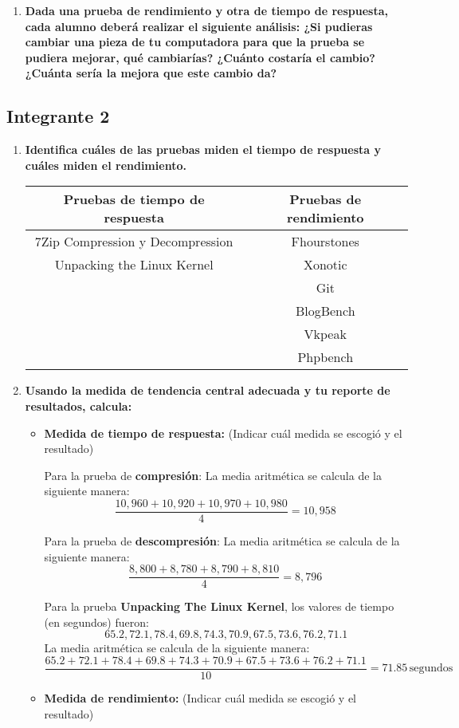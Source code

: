 \documentclass[12pt]{article}
\newcommand{\pl}[1]{\item \textbf{ #1 }}
\begin{document}
\begin{enumerate}[label=(\arabic{section}.\arabic{subsection}.\arabic{enumi})]
    \pl{Dada una prueba de rendimiento y otra de tiempo de respuesta, cada alumno deberá realizar el siguiente análisis: ¿Si pudieras cambiar una pieza de tu computadora para que la prueba se pudiera mejorar, qué cambiarías? ¿Cuánto costaría el cambio? ¿Cuánta sería la mejora que este cambio da?}

\end{enumerate}

\subsection{Integrante 2}

\begin{enumerate}[label=(\arabic{section}.\arabic{subsection}.\arabic{enumi})]
    \pl{Identifica cuáles de las pruebas miden el tiempo de respuesta y cuáles miden el rendimiento.}
    \begin{table}[htb]
        \centering
        \begin{tabular}{|c|c|}
        \hline
        Pruebas de tiempo de respuesta & Pruebas de rendimiento \\
        \hline
        7Zip Compression y Decompression & Fhourstones \\
        \hline
        Unpacking the Linux Kernel & Xonotic \\
        \hline
         & Git \\
        \hline
        & BlogBench \\
        \hline
        & Vkpeak \\
        \hline
        & Phpbench \\
        \hline
        \end{tabular}
    \end{table}\par

    \pl{Usando la medida de tendencia central adecuada y tu reporte de resultados, calcula:}
    \begin{itemize}
        \pl{Medida de tiempo de respuesta:}(Indicar cuál medida se escogió y el resultado)\par
    	Para la prueba de \textbf{compresión}:
La media aritmética se calcula de la siguiente manera:
\[
\frac{10,960 + 10,920 + 10,970 + 10,980}{4} = 10,958 \, 
\]

Para la prueba de \textbf{descompresión}:
La media aritmética se calcula de la siguiente manera:
\[
\frac{8,800 + 8,780 + 8,790 + 8,810}{4} = 8,796 \, 
\]

Para la prueba \textbf{Unpacking The Linux Kernel}, los valores de tiempo (en segundos) fueron:
\[
65.2, 72.1, 78.4, 69.8, 74.3, 70.9, 67.5, 73.6, 76.2, 71.1
\]
La media aritmética se calcula de la siguiente manera:
\[
\frac{65.2 + 72.1 + 78.4 + 69.8 + 74.3 + 70.9 + 67.5 + 73.6 + 76.2 + 71.1}{10} = 71.85 \, \text{segundos}
\]
        \pl{Medida de rendimiento:} (Indicar cuál medida se escogió y el resultado)\par
       

\end{itemize}
\end{enumerate}
\end{document}
